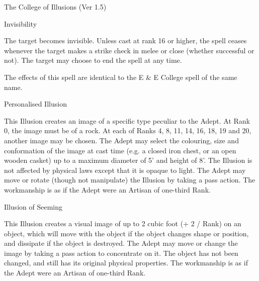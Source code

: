 \begin{Chapter}{The College of Illusions (Ver 1.5)}
\begin{spell}[G-4]{Invisibility}

\begin{effects}
The target becomes invisible.  Unless cast at rank 16 or higher, the
spell ceases whenever the target makes a strike check in melee or
close (whether successful or not). The target may choose to end the
spell at any time.

The effects of this spell are identical to the E \& E College spell of
the same name.
\end{effects}
\end{spell}

\begin{spell}[G-5]{Personalised Illusion}

\begin{effects}
This Illusion creates an image of a specific type peculiar to the
Adept.  At Rank 0, the image must be of a rock.  At each of Ranks 4,
8, 11, 14, 16, 18, 19 and 20, another image may be chosen.  The Adept
may select the colouring, size and conformation of the image at cast
time (e.g.  a closed iron chest, or an open wooden casket) up to a
maximum diameter of 5’ and height of 8’.  The Illusion is not affected
by physical laws except that it is opaque to light. The Adept may move
or rotate (though not manipulate) the Illusion by taking a pass
action.  The workmanship is as if the Adept were an Artisan of
one-third Rank.
\end{effects}
\end{spell}

\begin{spell}[G-6]{Illusion of Seeming}

\begin{effects}
This Illusion creates a visual image of up to 2 cubic foot (+ 2 /
Rank) on an object, which will move with the object if the object
changes shape or position, and dissipate if the object is destroyed.
The Adept may move or change the image by taking a pass action to
concentrate on it.  The object has not been changed, and still has its
original physical properties.  The workmanship is as if the Adept were
an Artisan of one-third Rank.


\end{effects}
\end{spell}
\end{Chapter}
